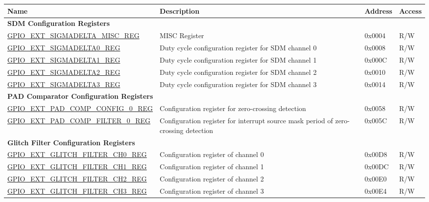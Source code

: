 \begin{longtable}{ | p{5.9cm} | p{6.8cm} | p{1.3cm} | p{1.9cm} | }
\hline\rowcolor{lightgray}
\textbf{Name} & \textbf{Description} &  \textbf{Address} & \textbf{Access} \\ \hline
\endhead
\multicolumn{4}{|l|}{\textbf{SDM Configuration Registers}} \\ \hline
\hyperref[regdesc:GPIOEXTSIGMADELTAMISCREG]{GPIO\_EXT\_SIGMADELTA\_MISC\_REG} & MISC Register & 0x0004 & R/W \\ \hline
\hyperref[regdesc:GPIOEXTSIGMADELTANREG]{GPIO\_EXT\_SIGMADELTA0\_REG} & Duty cycle configuration register for SDM channel 0 & 0x0008 & R/W \\ \hline
\hyperref[regdesc:GPIOEXTSIGMADELTANREG]{GPIO\_EXT\_SIGMADELTA1\_REG} & Duty cycle configuration register for SDM channel 1 & 0x000C & R/W \\ \hline
\hyperref[regdesc:GPIOEXTSIGMADELTANREG]{GPIO\_EXT\_SIGMADELTA2\_REG} & Duty cycle configuration register for SDM channel 2 & 0x0010 & R/W \\ \hline
\hyperref[regdesc:GPIOEXTSIGMADELTANREG]{GPIO\_EXT\_SIGMADELTA3\_REG} & Duty cycle configuration register for SDM channel 3 & 0x0014 & R/W \\ \hline
\multicolumn{4}{|l|}{\textbf{PAD Comparator Configuration Registers}} \\ \hline
\hyperref[regdesc:GPIOEXTPADCOMPCONFIG0REG]{GPIO\_EXT\_PAD\_COMP\_CONFIG\_0\_REG} & Configuration register for zero-crossing detection & 0x0058 & R/W \\ \hline
\hyperref[regdesc:GPIOEXTPADCOMPFILTER0REG]{GPIO\_EXT\_PAD\_COMP\_FILTER\_0\_REG} & Configuration register for interrupt source mask period of zero-crossing detection & 0x005C & R/W \\ \hline
\multicolumn{4}{|l|}{\textbf{Glitch Filter Configuration Registers}} \\ \hline
\hyperref[regdesc:GPIOEXTGLITCHFILTERCHNREG]{GPIO\_EXT\_GLITCH\_FILTER\_CH0\_REG} & Configuration register of channel 0 & 0x00D8 & R/W \\ \hline
\hyperref[regdesc:GPIOEXTGLITCHFILTERCHNREG]{GPIO\_EXT\_GLITCH\_FILTER\_CH1\_REG} & Configuration register of channel 1 & 0x00DC & R/W \\ \hline
\hyperref[regdesc:GPIOEXTGLITCHFILTERCHNREG]{GPIO\_EXT\_GLITCH\_FILTER\_CH2\_REG} & Configuration register of channel 2 & 0x00E0 & R/W \\ \hline
\hyperref[regdesc:GPIOEXTGLITCHFILTERCHNREG]{GPIO\_EXT\_GLITCH\_FILTER\_CH3\_REG} & Configuration register of channel 3 & 0x00E4 & R/W \\ \hline

\end{longtable}
